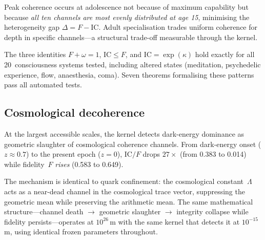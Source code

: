 \documentclass[
  aps,
  prx,
  twocolumn,
  superscriptaddress,
  nofootinbib,
  floatfix
]{revtex4-2}
\newcommand{\IC}{\mathrm{IC}}
\begin{document}
Peak coherence occurs at adolescence not because of maximum
capability but because \emph{all ten channels are most evenly
distributed at age 15}, minimising the heterogeneity gap
$\Delta = F - \IC$. Adult specialisation trades uniform coherence
for depth in specific channels---a structural trade-off
measurable through the kernel.

The three identities $F + \omega = 1$, $\IC \leq F$, and
$\IC = \exp(\kappa)$ hold exactly for all 20~consciousness systems
tested, including altered states (meditation, psychedelic
experience, flow, anaesthesia, coma). Seven theorems formalising
these patterns pass all automated tests.

\subsection{Cosmological decoherence}
\label{sec:cosmo}

At the largest accessible scales, the kernel detects dark-energy
dominance as geometric slaughter of cosmological coherence
channels. From dark-energy onset ($z \approx 0.7$) to the
present epoch ($z = 0$), $\IC/F$ drops $27\times$ (from
0.383 to 0.014) while fidelity~$F$ \emph{rises} (0.583 to 0.649).

The mechanism is identical to quark confinement: the cosmological
constant~$\Lambda$ acts as a near-dead channel in the
cosmological trace vector, suppressing the geometric mean while
preserving the arithmetic mean. The same mathematical
structure---channel death $\to$ geometric slaughter $\to$ integrity
collapse while fidelity persists---operates at $10^{26}$\,m
with the same kernel that detects it at $10^{-15}$\,m, using
identical frozen parameters throughout.
\end{document}
